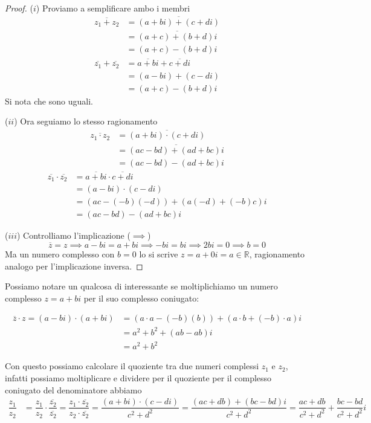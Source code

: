 \documentclass{rapport}
\begin{document}
\begin{proof}
  ($i$) Proviamo a semplificare ambo i membri
 \begin{align*}
  \overline{z_1 + z_2} &= \overline{(a+bi) + ( c+di)} \\
  &=  \overline{(a+c) + ( b+d)i} \\
  &= (a+c) - ( b+d)i
 \end{align*}
 \begin{align*}
  \overline{z_1}  + \overline{z_2} &= \overline{a+bi}  + \overline{ c+di} \\
  &=  (a-bi) + (c-di)\\
  &= (a+c) - ( b+d)i
 \end{align*}
 Si nota che sono uguali. 
 
 ($ii$) Ora seguiamo lo stesso ragionamento 
 \begin{align*}
  \overline{z_1 \cdot z_2} &= \overline{(a+bi) \cdot ( c+di)} \\
  &=  \overline{(ac  - bd)+ (ad + bc)i} \\
  &= (ac  - bd) - (ad + bc)i
 \end{align*}
 \begin{align*}
  \overline{z_1}  \cdot \overline{z_2} &= \overline{a+bi}  \cdot \overline{ c+di} \\
  &=  (a-bi) \cdot (c-di)\\
  &= (ac -(-b)(-d)) + ( a(-d)+ (-b)c)i \\
  &= (ac -bd) - ( ad+ bc)i 
 \end{align*}

 ($iii$) Controlliamo l'implicazione ($\implies$)
 \[
 \overline{z} = z \implies a-bi = a+bi \implies -bi = bi \implies 2bi = 0 \implies b=0
 \]
 Ma un numero complesso con $b=0$ lo si scrive $z = a + 0i = a \in \mathbb{R}$, ragionamento analogo per l'implicazione inversa.

\end{proof}

Possiamo notare un qualcosa di interessante se moltiplichiamo un numero complesso $z=a+bi$ per il suo complesso coniugato:

\begin{align*}
\overline{z} \cdot z = (a-bi) \cdot (a+bi) &= (a\cdot a - (-b)(b)) + (a\cdot b + (-b)\cdot a)i \\
  &= a^2 + b^2 + (ab-ab)i \\
  &= a^2+b^2
\end{align*}


Con questo possiamo calcolare il quoziente tra due numeri complessi $z_1$ e $z_2$, infatti possiamo moltiplicare e dividere per il quoziente per il complesso coniugato del denominatore abbiamo 
\begin{align*}
  \dfrac{z_1}{z_2} &= \dfrac{z_1}{z_2} \cdot  \dfrac{\overline{z_2}}{\overline{z_2}} = \dfrac{z_1\cdot\overline{z_2}}{z_2\cdot\overline{z_2}} = \dfrac{(a+bi)\cdot (c-di)}{c^2+d^2} = \dfrac{(ac+db) + (bc-bd)i}{c^2+d^2}  = \dfrac{ac+db}{c^2+d^2} +\dfrac{bc-bd}{c^2+d^2} i
\end{align*} 
\end{document}
